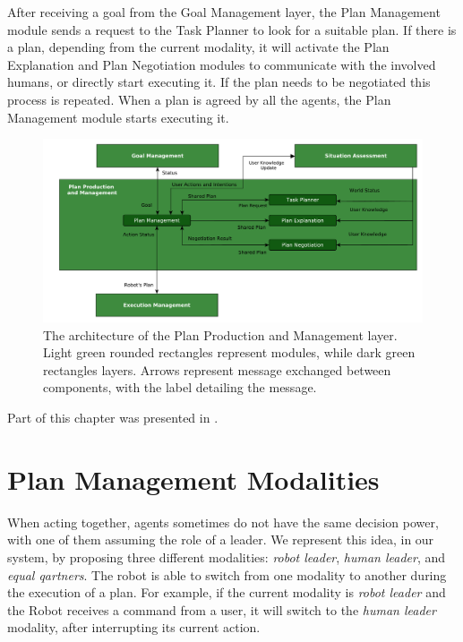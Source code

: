 After receiving a goal from the Goal Management layer, the Plan Management module sends a request to the Task Planner to look for a suitable plan. If there is a plan, depending from the current modality, it will activate the Plan Explanation and Plan Negotiation modules to communicate with the involved humans, or directly start executing it. If the plan needs to be negotiated this process is repeated. When a plan is agreed by all the agents, the Plan Management module starts executing it. 

\begin{figure}[ht!]
	\centering
	\includegraphics[scale=0.5]{img/plan_management/architecture.pdf}
	\caption[The architecture of the Plan Production and Management layer]{The architecture of the Plan Production and Management layer. Light green rounded rectangles represent modules, while dark green rectangles layers. Arrows represent message exchanged between components, with the label detailing the message.}
	\label{fig:plan_management-architecture}
\end{figure}


Part of this chapter was presented in \cite{Lallement2014,milliez2016using,fioreiser2014}.

\section{Plan Management Modalities}
\label{sec:plan_management-modalities}
When acting together, agents sometimes do not have the same decision power, with one of them assuming the role of a leader. We represent this idea, in our system, by proposing three different modalities: \textit{robot leader}, \textit{human leader}, and \textit{equal qartners}. The robot is able to switch from one modality to another during the execution of a plan. For example, if the current modality is \textit{robot leader} and the Robot receives a command from a user, it will switch to the \textit{human leader} modality, after interrupting its current action.

